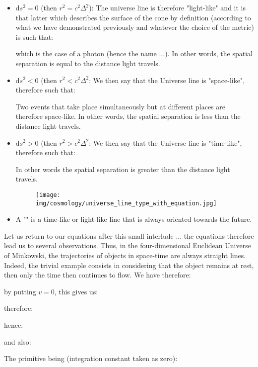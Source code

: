 	\begin{itemize}
		\item $\mathrm{d}s^2=0$ (then $r^2=c^2\Delta^2$): The universe line is therefore "light-like" and it is that latter which describes the surface of the cone by definition (according to what we have demonstrated previously and whatever the choice of the metric) is such that:
		
		which is the case of a photon (hence the name ...). In other words, the spatial separation is equal to the distance light travels.

		\item $\mathrm{d}s^2<0$ (then $r^2<c^2\Delta^2$: We then say that the Universe line is "space-like", therefore such that:
		
		Two events that take place simultaneously but at different places are therefore space-like. In other words, the spatial separation is less than the distance light travels.

		\item $\mathrm{d}s^2>0$ (then $r^2>c^2\Delta^2$: We then say that the Universe line is "time-like", therefore such that:
		
		In other words the spatial separation is greater than the distance light travels.
		\begin{figure}[H]
			\centering
			\texttt{[image: img/cosmology/universe\_line\_type\_with\_equation.jpg]}
		\end{figure}
		
		\item A "" is a time-like or light-like line that is always oriented towards the future.
	\end{itemize}
	Let us return to our equations after this small interlude ... the equations therefore lead us to several observations. Thus, in the four-dimensional Euclidean Universe of Minkowski, the trajectories of objects in space-time are always straight lines. Indeed, the trivial example consists in considering that the object remains at rest, then only the time then continues to flow. We have therefore:
	
	by putting $v=0$, this gives us:
	
	therefore:
	
	hence:
	
	and also:
	
	The primitive being (integration constant taken as zero):
	
